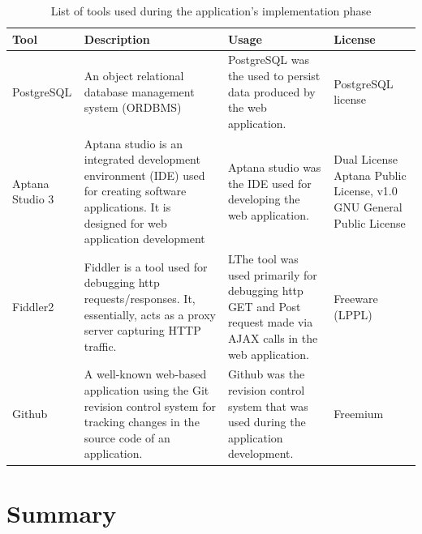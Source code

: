 \begin{table}
  \centering
  \begin{tabular}{|p{100px}|p{100px}|p{100px}|p{100px}|}
    \hline
    Tool  & Description & Usage & License \\
    \hline
    PostgreSQL & An object relational database management system (ORDBMS) & PostgreSQL was the used to persist data produced by the web application. & PostgreSQL license \\ \hline

    Aptana Studio 3 & Aptana studio is an integrated development environment (IDE) used for creating software applications. It is designed for web application development & Aptana studio was the IDE used for developing the web application. & Dual License Aptana Public License, v1.0 GNU General Public License \\ \hline

    Fiddler2 & Fiddler is a tool used for debugging http requests/responses. It, essentially, acts as a proxy server capturing HTTP traffic. & LThe tool was used primarily for debugging http GET and Post request made via AJAX calls in the web application.  & Freeware (LPPL) \\ \hline

    Github & A well-known web-based application using the Git revision control system for tracking changes in the source code of an application.  & Github was the revision control system that was used during the application development. & Freemium \\
    \hline
  \end{tabular}
  \caption{List of tools used during the application's implementation phase}\label{implementaioTools}
\end{table}

\section{Summary}


